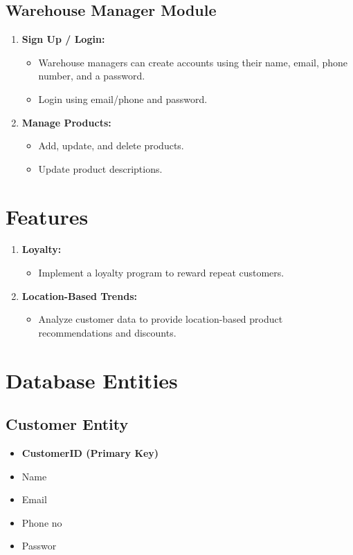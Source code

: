 \documentclass[12pt]{article}
\begin{document}
\subsection*{Warehouse Manager Module}
\begin{enumerate}[label=\arabic*.]
    \item \textbf{Sign Up / Login:}
          \begin{itemize}
              \item Warehouse managers can create accounts using their name, email, phone number, and a password.
              \item Login using email/phone and password.
          \end{itemize}
    \item \textbf{Manage Products:}
          \begin{itemize}
              \item Add, update, and delete products.
              \item Update product descriptions.
          \end{itemize}
\end{enumerate}

\section*{Features}
\begin{enumerate}[label=\arabic*.]
    \item \textbf{Loyalty:}
          \begin{itemize}
              \item Implement a loyalty program to reward repeat customers.
          \end{itemize}
    \item \textbf{Location-Based Trends:}
          \begin{itemize}
              \item Analyze customer data to provide location-based product recommendations and discounts.
          \end{itemize}
\end{enumerate}

\section*{Database Entities}

\subsection*{Customer Entity}
\begin{itemize}
    \item \textbf{CustomerID (Primary Key)}
    \item Name
    \item Email
    \item Phone no
    \item Passwor

\end{itemize}
\end{document}
